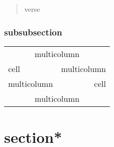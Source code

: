 \documentclass{article}
\begin{document}
\begin{verse}
verse
\end{verse}

\subsubsection{subsubsection}

\begin{tabular}[c]{|l|c|r|}
\hline
\multicolumn{3}{|c|}{multicolumn} \\
\cline{1-1}
cell & \multicolumn{2}{|r|}{multicolumn} \\
\cline{2-2}
\multicolumn{2}{|l|}{multicolumn} & cell \\
\cline{3-3}
\multicolumn{3}{|c|}{multicolumn} \\
\hline
\end{tabular}

\section*{section*}



\end{document}
